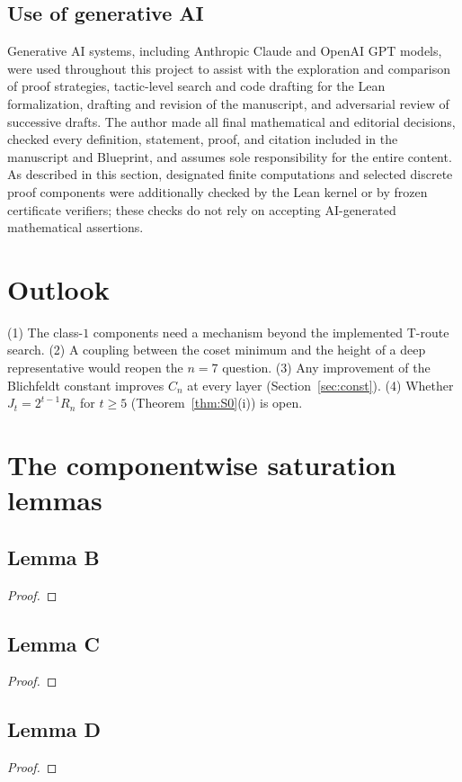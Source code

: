 \documentclass[11pt]{amsart}
\theoremstyle{remark}\newtheorem{remark}[theorem]{Remark}
\theoremstyle{definition}\newtheorem{definition}[theorem]{Definition}
\theoremstyle{definition}\newtheorem{algorithm}[theorem]{Algorithm}
\providecommand{\proofsdir}{../../proofs} %
\begin{document}
\subsection{Use of generative AI}
Generative AI systems, including Anthropic Claude and OpenAI GPT models, were used throughout this project to assist with the exploration and comparison of proof strategies, tactic-level search and code drafting for the Lean formalization, drafting and revision of the manuscript, and adversarial review of successive drafts. The author made all final mathematical and editorial decisions, checked every definition, statement, proof, and citation included in the manuscript and Blueprint, and assumes sole responsibility for the entire content. As described in this section, designated finite computations and selected discrete proof components were additionally checked by the Lean kernel or by frozen certificate verifiers; these checks do not rely on accepting AI-generated mathematical assertions.

\section{Outlook}
(1) The class-$1$ components need a mechanism beyond the implemented T-route search. (2) A coupling between the coset minimum and the height of a deep representative would reopen the $n=7$ question. (3) Any improvement of the Blichfeldt constant improves $C_n$ at every layer (Section~\ref{sec:const}). (4) Whether $J_t=2^{t-1}R_n$ for $t\ge5$ (Theorem~\ref{thm:S0}(i)) is open.

\appendix
\section{The componentwise saturation lemmas}\label{app:A}
\subsection*{Lemma B}
\begin{proof}

\end{proof}
\subsection*{Lemma C}
\begin{proof}

\end{proof}
\subsection*{Lemma D}
\begin{proof}

\end{proof}
\end{document}
